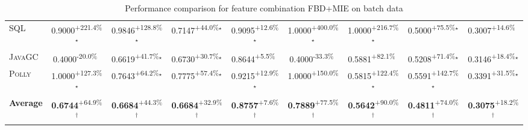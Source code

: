 \begin{table}[htbp]
\begin{tabular}{l|cccc|cccc}
\textsc{SQL} & \cellcolor{green!30}0.9000\textsuperscript{+221.4\%}$^\star$ & \cellcolor{green!30}0.9846\textsuperscript{+128.8\%}$^\star$ & \cellcolor{green!30}0.7147\textsuperscript{+44.0\%}$^\star$ & \cellcolor{green!30}0.9095\textsuperscript{+12.6\%}$^\star$ & \cellcolor{green!30}1.0000\textsuperscript{+400.0\%}$^\star$ & \cellcolor{green!30}1.0000\textsuperscript{+216.7\%}$^\star$ & \cellcolor{green!30}0.5000\textsuperscript{+75.5\%}$^\star$ & \cellcolor{green!30}0.3007\textsuperscript{+14.6\%}$^{\,\,\,}$ \\
\textsc{JavaGC} & \cellcolor{red!30}0.4000\textsuperscript{-20.0\%}$^{\,\,\,}$ & \cellcolor{green!30}0.6619\textsuperscript{+41.7\%}$^\star$ & \cellcolor{green!30}0.6730\textsuperscript{+30.7\%}$^\star$ & \cellcolor{green!30}0.8644\textsuperscript{+5.5\%}$^{\,\,\,}$ & \cellcolor{red!30}0.4000\textsuperscript{-33.3\%}$^{\,\,\,}$ & \cellcolor{green!30}0.5881\textsuperscript{+82.1\%}$^{\,\,\,}$ & \cellcolor{green!30}0.5208\textsuperscript{+71.4\%}$^\star$ & \cellcolor{green!30}0.3146\textsuperscript{+18.4\%}$^\star$ \\
\textsc{Polly} & \cellcolor{green!30}1.0000\textsuperscript{+127.3\%}$^\star$ & \cellcolor{green!30}0.7643\textsuperscript{+64.2\%}$^\star$ & \cellcolor{green!30}0.7775\textsuperscript{+57.4\%}$^\star$ & \cellcolor{green!30}0.9215\textsuperscript{+12.9\%}$^\star$ & \cellcolor{green!30}1.0000\textsuperscript{+150.0\%}$^{\,\,\,}$ & \cellcolor{green!30}0.5815\textsuperscript{+122.4\%}$^\star$ & \cellcolor{green!30}0.5591\textsuperscript{+142.7\%}$^\star$ & \cellcolor{green!30}0.3391\textsuperscript{+31.5\%}$^\star$ \\
\hline
\textbf{Average} & \cellcolor{green!30}\textbf{0.6744}\textsuperscript{+64.9\%}$^\dagger$ & \cellcolor{green!30}\textbf{0.6684}\textsuperscript{+44.3\%}$^\dagger$ & \cellcolor{green!30}\textbf{0.6684}\textsuperscript{+32.9\%}$^\dagger$ & \cellcolor{green!30}\textbf{0.8757}\textsuperscript{+7.6\%}$^\dagger$ & \cellcolor{green!30}\textbf{0.7889}\textsuperscript{+77.5\%}$^\dagger$ & \cellcolor{green!30}\textbf{0.5642}\textsuperscript{+90.0\%}$^\dagger$ & \cellcolor{green!30}\textbf{0.4811}\textsuperscript{+74.0\%}$^\dagger$ & \cellcolor{green!30}\textbf{0.3075}\textsuperscript{+18.2\%}$^\dagger$ \\
\hline
\end{tabular}
\caption{Performance comparison for feature combination FBD+MIE on batch data}
\label{tab:combo_FBD_MIE_performance_batch}
\end{table}